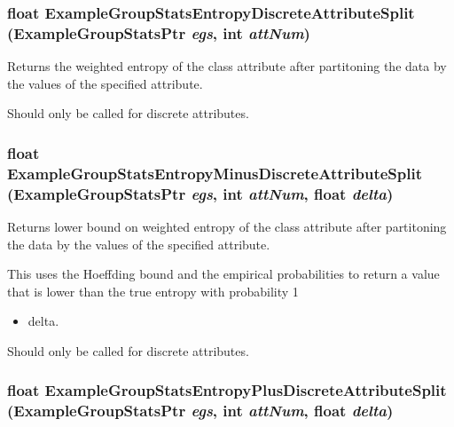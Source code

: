 \subsubsection{\setlength{\rightskip}{0pt plus 5cm}float Example\-Group\-Stats\-Entropy\-Discrete\-Attribute\-Split ({\bf Example\-Group\-Stats\-Ptr} {\em egs}, int {\em att\-Num})}\label{ExampleGroupStats_8h_a43}


Returns the weighted entropy of the class attribute after partitoning the data by the values of the specified attribute. 

Should only be called for discrete attributes. 
\subsubsection{\setlength{\rightskip}{0pt plus 5cm}float Example\-Group\-Stats\-Entropy\-Minus\-Discrete\-Attribute\-Split ({\bf Example\-Group\-Stats\-Ptr} {\em egs}, int {\em att\-Num}, float {\em delta})}\label{ExampleGroupStats_8h_a45}


Returns lower bound on weighted entropy of the class attribute after partitoning the data by the values of the specified attribute. 

This uses the Hoeffding bound and the empirical probabilities to return a value that is lower than the true entropy with probability 1\begin{itemize}
\item delta.\end{itemize}


Should only be called for discrete attributes. 
\subsubsection{\setlength{\rightskip}{0pt plus 5cm}float Example\-Group\-Stats\-Entropy\-Plus\-Discrete\-Attribute\-Split ({\bf Example\-Group\-Stats\-Ptr} {\em egs}, int {\em att\-Num}, float {\em delta})}\label{ExampleGroupStats_8h_a44}


